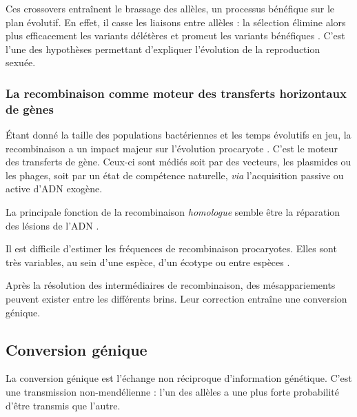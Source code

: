 \documentclass[11pt, oneside]{scrartcl}
\begin{document}
Ces crossovers entraînent le brassage des allèles, un processus bénéfique sur le
plan évolutif\cite{webster_direct_2012}. En effet, il casse les liaisons entre
allèles : la sélection élimine alors plus efficacement les variants délétères et
promeut les variants bénéfiques \cite{otto_resolving_2002}. C'est l'une des
hypothèses permettant d'expliquer l'évolution de la reproduction
sexuée\cite{otto_why_2006}.

\subsubsection{La recombinaison comme moteur des transferts horizontaux de gènes}
\label{sec:orgheadline5}

Étant donné la taille des populations bactériennes et les temps évolutifs en
jeu, la recombinaison a un impact majeur sur l'évolution procaryote
\cite{didelot_impact_2010}. C'est le moteur des transferts de gène. Ceux-ci sont
médiés soit par des vecteurs, les plasmides ou les phages, soit par un état de
compétence naturelle, \emph{via} l'acquisition passive ou active d'ADN exogène. 

La principale fonction de la recombinaison \emph{homologue} semble être la réparation
des lésions de l'ADN \cite{fall_horizontal_2007, michod_adaptive_2008}. 

Il est difficile d'estimer les fréquences de recombinaison procaryotes. Elles
sont très variables, au sein d'une espèce, d'un écotype ou entre espèces
\cite{didelot_impact_2010}.


\begin{transition}
Après la résolution des intermédiaires de recombinaison, des mésappariements
peuvent exister entre les différents brins. Leur correction entraîne une
conversion génique.
\end{transition}


\subsection{Conversion génique}
\label{sec:orgheadline2}
La conversion génique est l'échange non réciproque d'information génétique.
C'est une transmission non-mendélienne : l'un des allèles a une plus forte
probabilité d'être transmis que l'autre\cite{chen_gene_2007}. 
\end{document}
